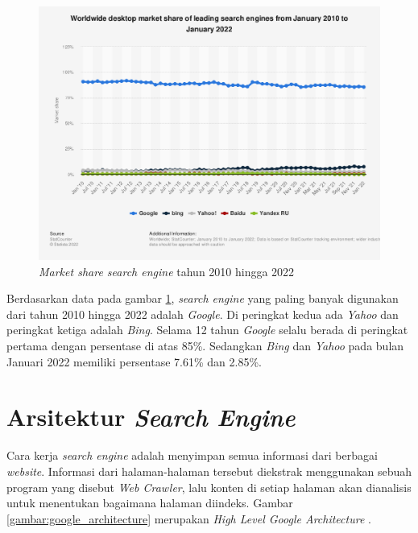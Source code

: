 \begin{figure}[H]
	\centering
	\includegraphics[keepaspectratio, width=12cm]{gambar/market_share_search_engine}
	\caption{\textit{Market share search engine} tahun 2010 hingga 2022 \citep{statista}}
	\label{gambar:market_share_search_engine}
\end{figure}

Berdasarkan data pada gambar \ref{gambar:market_share_search_engine}, \textit{search engine} yang paling banyak digunakan dari tahun 2010 hingga 2022 adalah \textit{Google}. Di peringkat kedua ada \textit{Yahoo} dan peringkat ketiga adalah \textit{Bing}. Selama 12 tahun \textit{Google} selalu berada di peringkat pertama dengan persentase di atas 85\%. Sedangkan \textit{Bing} dan \textit{Yahoo} pada bulan Januari 2022 memiliki persentase 7.61\% dan 2.85\%.

\section{Arsitektur \emph{Search Engine}}

Cara kerja \textit{search engine} adalah menyimpan semua informasi dari berbagai \textit{website}. Informasi dari halaman-halaman tersebut diekstrak menggunakan sebuah program yang disebut \emph{Web Crawler}, lalu konten di setiap halaman akan dianalisis untuk menentukan bagaimana halaman diindeks. Gambar \ref{gambar:google_architecture} merupakan \textit{High Level Google Architecture} \citep{brin1998anatomy}.

